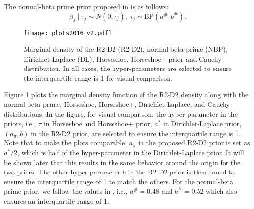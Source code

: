 \documentclass[12pt]{article}
\begin{document}
	The normal-beta prime prior proposed in  \cite{bai2019large} is as follows:
\begin{equation}\label{eq_normal beta prime}
\beta_j \mid \tau_j \sim N(0, \tau_j), \
\tau_j \sim \text{BP}(a^\#,b^\#).
\end{equation}





%
%





\begin{figure}[h!]
	\centering
	\texttt{[image: plots2016\_v2.pdf]}
	\caption{Marginal density of the  R2-D2 (R2-D2),  normal-beta prime (NBP),  Dirichlet-Laplace (DL),  Horseshoe, Horseshoe+ prior and  Cauchy distribution.
		In all cases, the  hyper-parameters are selected  to ensure  the  interquartile range  is 1 for visual comparison.   }\label{figure_density function}
\end{figure}


Figure \ref{figure_density function} plots   the marginal density function of the  R2-D2 density along with   the  normal-beta prime, Horseshoe, Horseshoe+,  Dirichlet-Laplace,  and Cauchy distributions.   In the figure,  for   visual comparison, the hyper-parameter  in the priors, i.e.,  $\tau$ in  Horseshoe and Horseshoe+ prior, $a^\ast$ in Dirichlet-Laplace prior, $(a_\pi, b)$ in  the  R2-D2 prior,
are   selected   to ensure the  interquartile range is 1.    Note that to make the plots comparable,   $a_\pi$ in the proposed R2-D2 prior  is set as $a^\ast/2$, which is half of the hyper-parameter  in the  Dirichlet-Laplace prior.
 It will be shown later that this results in the same behavior around the origin for the two priors.
The other hyper-parameter  $b$   in the R2-D2  prior is then  tuned to ensure the interquartile range   of 1 to match the others.   For the normal-beta prime prior, we follow the values in \cite{bai2019large}, i.e.,  $a^\#=0.48$ and $b^\#=0.52$ which also ensures an interquartile range of 1.
\end{document}

